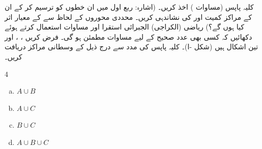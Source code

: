 کلیہ پاپس (مساوات )  اخذ کریں۔ (اشارہ:  ربع اول میں ان خطوں کو ترسیم کر کے ان کے  مراکز کمیت   اور  کی نشاندہی کریں۔  محددی محوروں  کے لحاظ سے  کے معیار اثر   کیا ہوں گے؟)
ریاضی (الکراجی) الجبرائی   استقرا اور مساوات  استعمال کرتے ہوئے دکھائیں کہ کسی بھی عدد صحیح  کے لیے  مساوات  مطمئن ہو گی۔
فرض کریں  ،  ، اور  تین اشکال ہیں (شکل -ا)۔ کلیہ پاپس کی مدد سے  درج ذیل کے وسطانی مراکز دریافت کریں۔
\begin{multicols}{4}
\begin{enumerate}[a.]
\item
$A\cup B$
\item
$A\cup C$
\item
$B\cup C$
\item
$A\cup B\cup C$
\end{enumerate}
\end{multicols}
